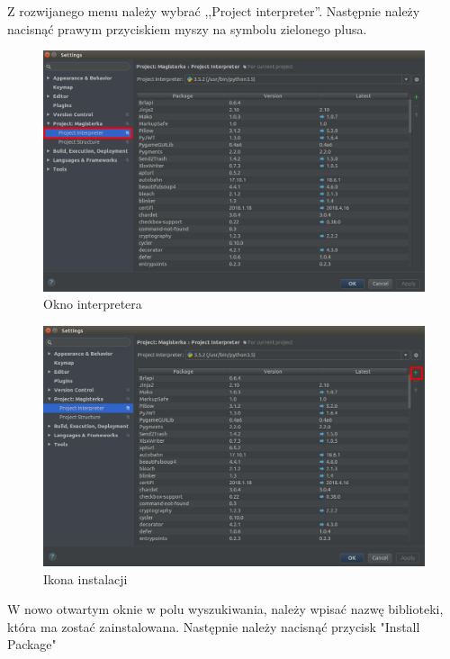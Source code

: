 Z rozwijanego menu należy wybrać ,,Project interpreter''. Następnie należy nacisnąć prawym przyciskiem myszy na symbolu zielonego plusa.

\begin{figure}[h]
\centering
\includegraphics[width=13cm]{Zdjecia/5/kasia/settings3}
\caption{Okno interpretera}
\label{fig:file}
\end{figure}

\begin{figure}[h]
\centering
\includegraphics[width=13cm]{Zdjecia/5/kasia/settings4}
\caption{Ikona instalacji}
\label{fig:file}
\end{figure}

W nowo otwartym oknie w polu wyszukiwania, należy wpisać nazwę biblioteki, która ma zostać zainstalowana. Następnie należy nacisnąć przycisk "Install Package"

